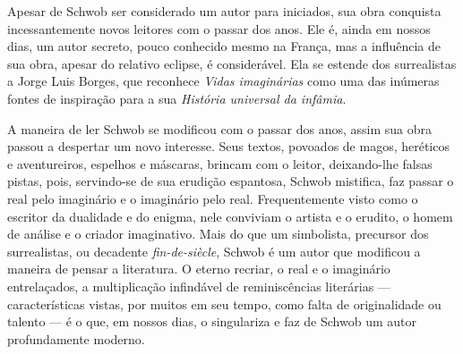 Apesar de Schwob ser considerado um autor para iniciados, sua obra conquista
incessantemente novos leitores com o passar dos anos. Ele é, ainda em nossos
dias, um autor secreto, pouco conhecido mesmo na França, mas a influência de
sua obra, apesar do relativo eclipse, é considerável. Ela se estende
dos surrealistas a Jorge Luis Borges, que reconhece \textit{Vidas imaginárias}
como uma das inúmeras fontes de inspiração para a sua \textit{História
universal da infâmia}.

A maneira de ler Schwob se modificou com o passar dos anos, assim sua obra
passou a despertar um novo interesse. Seus textos, povoados de magos, heréticos
e aventureiros, espelhos e máscaras, brincam com o leitor, deixando-lhe falsas
pistas, pois, servindo-se de sua erudição espantosa, Schwob mistifica, faz
passar o real pelo imaginário e o imaginário pelo real. Frequentemente visto
como o escritor da dualidade e do enigma, nele conviviam o artista e o erudito,
o homem de análise e o criador imaginativo. Mais do que um simbolista,
precursor dos surrealistas, ou decadente \textit{fin-de-siècle}, Schwob é
um autor que modificou a maneira de pensar a literatura. O eterno
recriar, o real e o imaginário entrelaçados, a multiplicação infindável de
reminiscências literárias --- características vistas, por muitos em seu tempo,
como falta de originalidade ou talento --- é o que, em nossos dias, o singulariza
e faz de Schwob um autor profundamente moderno.